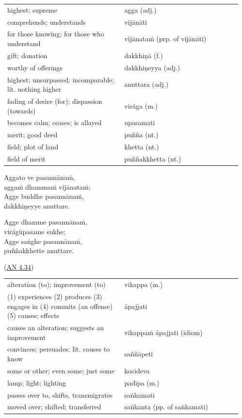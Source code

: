 \documentclass[11pt,oneside]{memoir}
\begin{document}
\begin{longtable}{L{0.48\linewidth} L{0.48\linewidth}}
highest; supreme & agga (adj.)\\
comprehends; understands & vijānāti\\
for those knowing; for those who understand & vijānataṁ (prp. of vijānāti)\\
gift; donation & dakkhiṇā (f.)\\
worthy of offerings & dakkhiṇeyya (adj.)\\
highest; unsurpassed; incomparable; lit. nothing higher & anuttara (adj.)\\
fading of desire (for); dispassion (towards) & virāga (m.)\\
becomes calm; ceases; is allayed & upasamati\\
merit; good deed & puñña (nt.)\\
field; plot of land & khetta (nt.)\\
field of merit & puññakkhetta (nt.)\\
\end{longtable}

\bigskip

\begin{multicols}{2}
\setlength{\columnseprule}{0pt}

Aggato ve pasannānaṁ, \\
aggaṁ dhammaṁ vijānataṁ; \\
Agge buddhe pasannānaṁ, \\
dakkhiṇeyye anuttare.

\columnbreak

Agge dhamme pasannānaṁ, \\
virāgūpasame sukhe; \\
Agge saṅghe pasannānaṁ, \\
puññakkhette anuttare.

(\href{https://suttacentral.net/an4.34/pli/ms}{AN 4.34})

\end{multicols}

\bigskip

\begin{longtable}{L{0.48\linewidth} L{0.48\linewidth}}
alteration (to); improvement (to) & vikappa (m.)\\
(1) experiences (2) produces (3) engages in (4) commits (an offense) (5) causes; effects & āpajjati\\
causes an alteration; suggests an improvement & vikappaṁ āpajjati (idiom)\\
convinces; persuades; lit. causes to know & saññāpeti\\
some or other; even some; just some & kocideva\\
lamp; light; lighting & padīpa (m.)\\
passes over to, shifts, transmigrates & saṅkamati\\
moved over; shifted; transferred & saṅkanta (pp. of saṅkamati)\\
\end{longtable}
\end{document}
